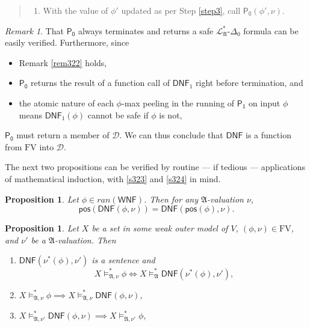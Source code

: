 \documentclass[12pt, twoside]{memoir}
\numberwithin{equation}{section}
\newtheorem{prop}[thm]{Proposition}
\theoremstyle{definition}
\theoremstyle{remark}
\newtheorem{rem}[thm]{Remark}
\theoremstyle{definition}
\theoremstyle{definition}
\theoremstyle{definition}
\theoremstyle{remark}
\begin{document}
\begin{quote}
\begin{enumerate}[label=(\arabic*)]
        \item With the value of $\phi'$ updated as per Step \ref{step3}, call $\mathsf{P_0}(\phi', \nu)$.
    \end{enumerate}
\end{quote}

\begin{rem}\label{rem324}
That $\mathsf{P_0}$ always terminates and returns a safe $\mathcal{L}^{*}_{\mathfrak{A}}$-$\Delta_0$ formula can be easily verified. Furthermore, since 
\begin{itemize}
    \item Remark \ref{rem322} holds,
    \item $\mathsf{P_0}$ returns the result of a function call of $\mathsf{DNF}_1$ right before termination, and
    \item the atomic nature of each $\phi$-max peeling in the running of $\mathsf{P_1}$ on input $\phi$ means $\mathsf{DNF}_1(\phi)$ cannot be safe if $\phi$ is not,
\end{itemize}
$\mathsf{P_0}$ must return a member of $\mathcal{D}$. We can thus conclude that $\mathsf{DNF}$ is a function from $\mathrm{FV}$ into $\mathcal{D}$.
\end{rem}

The next two propositions can be verified by routine --- if tedious --- applications of mathematical induction, with \ref{s323} and \ref{s324} in mind.

\begin{prop}\label{prop321}
Let $\phi \in ran(\mathsf{WNF})$. Then for any $\mathfrak{A}$-valuation $\nu$,
\begin{equation*}
    \mathsf{pos}(\mathsf{DNF}(\phi, \nu)) = \mathsf{DNF}(\mathsf{pos}(\phi), \nu) \text{.}
\end{equation*}
\end{prop}

\begin{prop}\label{p320}
Let $X$ be a set in some weak outer model of $V$, $(\phi, \nu) \in \mathrm{FV}$, and $\nu'$ be a $\mathfrak{A}$-valuation. Then
\begin{enumerate}[label=(\arabic*)]
    \item\label{p3201} $\mathsf{DNF}(\nu^*(\phi), \nu')$ is a sentence and $$X \models^*_{\mathfrak{A}, \nu} \phi \iff X \models^*_{\mathfrak{A}} \mathsf{DNF}(\nu^*(\phi), \nu') \text{,}$$
    \item\label{p3202} $X \models^*_{\mathfrak{A}, \nu} \phi \implies X \models^*_{\mathfrak{A}, \nu} \mathsf{DNF}(\phi, \nu)$,
    \item\label{p3203} $X \models^*_{\mathfrak{A}, \nu'} \mathsf{DNF}(\phi, \nu) \implies X \models^*_{\mathfrak{A}, \nu'} \phi$,
\end{enumerate}
\end{prop}
\end{document}
